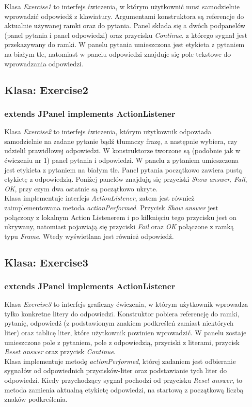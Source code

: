 \documentclass[11pt]{article}
\begin{document}
Klasa \textit{Exercise1} to interfejs ćwiczenia, w którym użytkownić musi samodzielnie wprowadzić odpowiedź z klawiatury. Argumentami konstruktora są referencje do aktualnie używanej ramki oraz do pytania. Panel składa się a dwóch podpanelów (panel pytania i panel odpowiedzi) oraz przycisku \textit{Continue}, z którego sygnał jest przekazywany do ramki. W panelu pytania umieszczona jest etykieta z pytaniem na białym tle, natomiast w panelu odpowiedzi znajduje się pole tekstowe do wprowadzania odpowiedzi.

\subsection{Klasa: Exercise2}
\subsubsection*{extends JPanel implements ActionListener}

Klasa \textit{Exercise2} to interfejs ćwiczenia, którym użytkownik odpowiada samodzielnie na zadane pytanie bądź tłumaczy frazę, a następnie wybiera, czy udzielił prawidłowej odpowiedzi. W konstruktorze tworzone są (podobnie jak w ćwiczeniu nr 1) panel pytania i odpowiedzi. W panelu z pytaniem umieszczona jest etykieta z pytaniem na białym tle. Panel pytania początkowo zawiera pustą etykietę z odpowiedzią. Poniżej panelów znajdują się przyciski \textit{Show answer}, \textit{Fail}, \textit{OK}, przy czym dwa ostatnie są początkowo ukryte.\\
Klasa implementuje interfejs \textit{ActionListener}, zatem jest również zaimplementowana metoda \textit{actionPerformed}. Przycisk \textit{Show answer} jest połączony z lokalnym Action Listenerem i po kilknięciu tego przycisku jest on ukrywany, natomiast pojawiają się przyciski \textit{Fail} oraz \textit{OK} połączone z ramką typu \textit{Frame}. Wtedy wyświetlana jest również odpowiedź.

\subsection{Klasa: Exercise3}
\subsubsection*{extends JPanel implements ActionListener}
Klasa \textit{Exercise3} to interfejs graficzny ćwiczenia, w którym użytkownik wprowadza tylko konkretne litery do odpowiedzi. Konstruktor pobiera referencję do ramki, pytanię, odpowiedź (z podstawionym znakiem podkreśleń zamiast niektórych liter) oraz tablicę liter, które użytkownik powinien wprowadzić. W panelu zostaje umieszczone pole z pytaniem, pole z odpowiedzią, przyciski z literami, przycisk \textit{Reset answer} oraz przycisk \textit{Continue}.\\
Klasa implementuje metodę \textit{actionPerformed}, której zadaniem jest odbieranie sygnałów od odpowiednich przycisków-liter oraz podstawianie tych liter do odpowiedzi. Kiedy przychodzący sygnał pochodzi od przycisku \textit{Reset answer}, to metoda zamienia aktualną etykietę odpowiedzi, na startową z początkową liczbą znaków podkreślenia.
\end{document}
